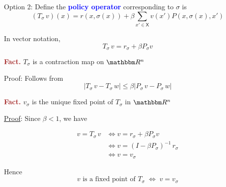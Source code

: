 \documentclass[xcolor=dvipsnames]{beamer}
\renewcommand{\leq}{\leqslant}
\newcommand{\navy}[1]{\textcolor{Blue}{\bf #1}}
\newcommand{\Fact}{\textcolor{Brown}{\bf Fact. }}
\newcommand{\RR}{\mathbbm R}
\newcommand{\Xsf}{\mathsf X}
\renewcommand{\leq}{\leqslant}
\newcommand{\1}{\mathbbm 1}
\begin{document}
\begin{frame}

   Option 2: Define the \navy{policy operator} corresponding to $\sigma$ is
    \begin{equation*}
        (T_\sigma \, v)(x)
        =
            r(x, \sigma(x))
            + \beta
            \sum_{x' \in \Xsf} v(x') P(x, \sigma(x), x')
    \end{equation*}



    \vspace{0.5em}
    In vector notation,
    \begin{equation*}
        T_\sigma \, v 
        = r_\sigma + \beta P_\sigma v
    \end{equation*}

    \vspace{0.5em}
    \vspace{0.5em}
    \vspace{0.5em}
    \vspace{0.5em}

    \Fact $T_\sigma$ is a contraction map on $\RR^n$

    \vspace{0.5em}
    Proof: Follows from
    \begin{equation*}
        |T_\sigma \, v - T_\sigma \, w|
        \leq \beta |P_\sigma \, v - P_\sigma \, w|
    \end{equation*}

\end{frame}



\begin{frame}
    
    \Fact $v_\sigma$ is the unique fixed
    point of $T_\sigma$ in $\RR^n$ 

    \pause
    \vspace{0.5em}
    \vspace{0.5em}
    \underline{Proof}: Since $\beta < 1$, we have

    \begin{align*}
        v = T_\sigma \, v
        & \iff v = r_\sigma + \beta P_\sigma v
        \\
        & \iff v = (I - \beta P_\sigma)^{-1} \, r_\sigma 
        \\
        & \iff v = v_\sigma
    \end{align*}

    \vspace{0.5em}
    Hence 
    $$v \text{ is a fixed point of } T_\sigma \; \iff \; v = v_\sigma $$

\end{frame}
\end{document}
